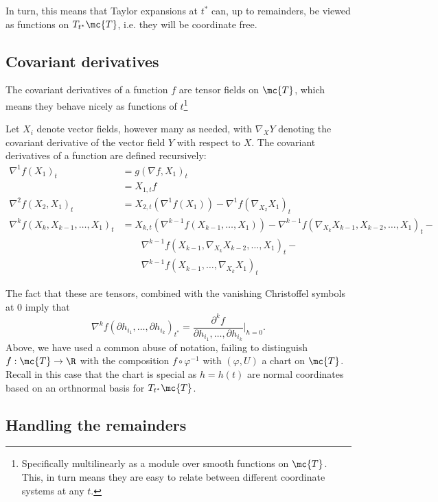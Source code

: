 \documentclass{article}
\begin{document}
In turn, this means that Taylor expansions at $t^*$ can, up to remainders, be viewed as functions on $T_{t^*}\mc{T}$, i.e. they will be coordinate free.

\subsection{Covariant derivatives}

The covariant derivatives of a function $f$ are tensor fields on $\mc{T}$, which means they behave nicely
as functions of $t$\footnote{Specifically multilinearly as a module over smooth functions on $\mc{T}$. This,
in turn means they are easy to relate between different coordinate systems at any $t$.}

Let $X_i$ denote vector fields, however many as needed, with $\nabla_XY$ denoting
the covariant derivative of the vector field $Y$ with respect to $X$. The covariant
derivatives of a function are defined recursively:
$$
\begin{aligned}
  \nabla^1 f(X_1)_t &= g(\nabla f, X_1)_t \\
  &= X_{1,t}f \\
  \nabla^2 f(X_2, X_1)_t &= X_{2,t}(\nabla^1 f(X_1)) - \nabla^1 f(\nabla_{X_2}X_1)_t \\
  \nabla^k f(X_k, X_{k-1}, \dots, X_1)_t &= X_{k,t}(\nabla^{k-1} f(X_{k-1}, \dots, X_1)) -
  \nabla^{k-1} f(\nabla_{X_k}X_{k-1}, X_{k-2}, \dots, X_1)_t - \\
&  \qquad   \nabla^{k-1} f(X_{k-1}, \nabla_{X_k}X_{k-2}, \dots, X_1)_t - \\
  & \qquad \nabla^{k-1} f(X_{k-1}, \dots, \nabla_{X_k}X_1)_t
  \end{aligned}
$$

The fact that these are tensors, combined with the vanishing Christoffel symbols at 0 imply that
$$
\nabla^k f(\partial h_{i_1}, \dots, \partial h_{i_k})_{t^*} = \frac{\partial^k f}{\partial h_{i_1}, \dots, \partial h_{i_k}} \biggl|_{h=0}.
$$
Above, we have used a common abuse of notation, failing to distinguish $f:\mc{T} \rightarrow \R$ with the
composition $f \circ \varphi^{-1}$ with $(\varphi, U)$ a chart on $\mc{T}$. Recall in this case that the
chart is special as $h=h(t)$ are normal coordinates based on an orthnormal basis for $T_{t^*}\mc{T}$.

\subsection{Handling the remainders}
\end{document}
